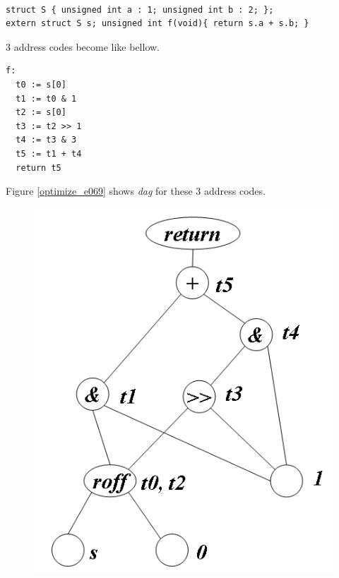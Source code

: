 \begin{Example}
\label{optimize_e068}
\begin{verbatim}

struct S { unsigned int a : 1; unsigned int b : 2; };
extern struct S s; unsigned int f(void){ return s.a + s.b; }
\end{verbatim}
3 address codes become like bellow.
\begin{verbatim}
f:
  t0 := s[0]
  t1 := t0 & 1
  t2 := s[0]
  t3 := t2 >> 1
  t4 := t3 & 3
  t5 := t1 + t4
  return t5
\end{verbatim}
Figure \ref{optimize_e069} shows {\em dag} for these 3 address codes.
\begin{figure}[htbp]
\begin{center}
\begin{htmlonly}
\includegraphics[width=0.826\linewidth,height=1.0\linewidth]{opt028.png}
\end{htmlonly}
\begin{latexonly}

\end{latexonly}
\end{center}
\end{figure}
\end{Example}
